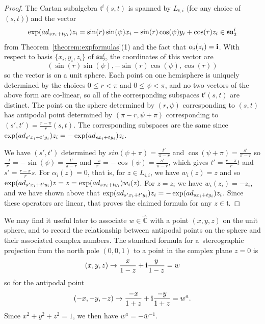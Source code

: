 \documentclass[11pt]{article}
\numberwithin{equation}{section}
\numberwithin{equation}{section}
\def\C{{\mathbb C}}
\def\bi{{\bf i}}
\def\ft{\mathfrak{t}}
\def\fsu{\mathfrak{su}}
\begin{document}
\begin{proof}
The Cartan subalgebra $\ft^i(s,t)$ is spanned by $L_{\ft,i}$ (for any choice of $(s,t)$) and the vector
\[\exp( {\rm ad}_{sx_i+ty_i}) z_i= \sin(r)\sin(\psi)x_i - \sin(r) \cos(\psi) y_i + \cos(r) z_i \in \fsu_2^i\]
from Theorem~\ref{theorem:expformulas}(1) and the fact that $\alpha_i(z_i) = \bi$.
With respect to basis $\{x_i,y_i,z_i\}$ of $\fsu_2^i$, the coordinates of this vector are
\[(\sin(r)\sin(\psi), - \sin(r) \cos(\psi), \cos(r))\]
so the vector is on a unit sphere. Each point on one hemisphere is uniquely determined by the choices
$0\leq r < \pi$ and $0\leq\psi<\pi$, and no two vectors of the above form are co-linear, so all of the corresponding subspaces $\ft^i(s,t)$ are distinct. The point on the sphere determined by $(r,\psi)$ corresponding to $(s,t)$ has antipodal point determined by $(\pi-r,\psi+\pi)$ corresponding to $(s',t') = \frac{r-\pi}{r}(s,t)$. The corresponding subspaces are the same since
$\exp( {\rm ad}_{s'x_i+t'y_i}) z_i = - \exp( {\rm ad}_{sx_i+ty_i}) z_i$.

We have $(s',t')$ determined by $sin(\psi+\pi) = \frac{t'}{\pi-r}$ and $\cos(\psi+\pi) = \frac{s'}{\pi-r}$ so $\frac{-t}{r} = -\sin(\psi) = \frac{t'}{\pi-r}$ and $\frac{-s}{r} = -\cos(\psi) = \frac{s'}{\pi-r}$, which gives $t' = \frac{r-\pi}{r} t$ and $s' = \frac{r-\pi}{r} s$. For $\alpha_i(z) = 0$, that is, for $z\in L_{\ft,i}$, we have $w_i(z) = z$ and so $\exp( {\rm ad}_{s'x_i+t'y_i}) z = z = \exp( {\rm ad}_{sx_i+ty_i}) w_i(z)$. For $z = z_i$ we have $w_i(z_i) = -z_i$, and we have shown above that $\exp( {\rm ad}_{s'x_i+t'y_i}) z_i = - \exp( {\rm ad}_{sx_i+ty_i}) z_i$. Since these operators are linear, that proves the claimed formula for any $z\in\ft$.
\end{proof}

\begin{Remark}We may find it useful later to associate $w\in\hat\C$ with a point $(x,y,z)$ on the unit sphere, and to record the relationship between antipodal points on the sphere and their associated complex numbers. The standard formula for a~stereographic projection from the north pole $(0,0,1)$ to a point in the complex plane $z = 0$ is
\[(x,y,z) \to \frac{x}{1-z} + \bi \frac{y}{1-z} = w\]
so for the antipodal point
\[(-x,-y,-z) \to \frac{-x}{1+z} + \bi \frac{-y}{1+z} = w^a.\]
Since $x^2 + y^2 + z^2 = 1$, we then have $w^a = -{\bar w}^{-1}$.
\end{Remark}
\end{document}
